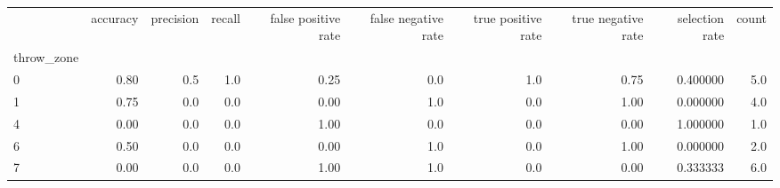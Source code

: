 \begin{tabular}{lrrrrrrrrr}
\toprule
{} &  accuracy &  precision &  recall &  false positive rate &  false negative rate &  true positive rate &  true negative rate &  selection rate &  count \\
throw\_zone &           &            &         &                      &                      &                     &                     &                 &        \\
\midrule
0          &      0.80 &        0.5 &     1.0 &                 0.25 &                  0.0 &                 1.0 &                0.75 &        0.400000 &    5.0 \\
1          &      0.75 &        0.0 &     0.0 &                 0.00 &                  1.0 &                 0.0 &                1.00 &        0.000000 &    4.0 \\
4          &      0.00 &        0.0 &     0.0 &                 1.00 &                  0.0 &                 0.0 &                0.00 &        1.000000 &    1.0 \\
6          &      0.50 &        0.0 &     0.0 &                 0.00 &                  1.0 &                 0.0 &                1.00 &        0.000000 &    2.0 \\
7          &      0.00 &        0.0 &     0.0 &                 1.00 &                  1.0 &                 0.0 &                0.00 &        0.333333 &    6.0 \\
\bottomrule
\end{tabular}
